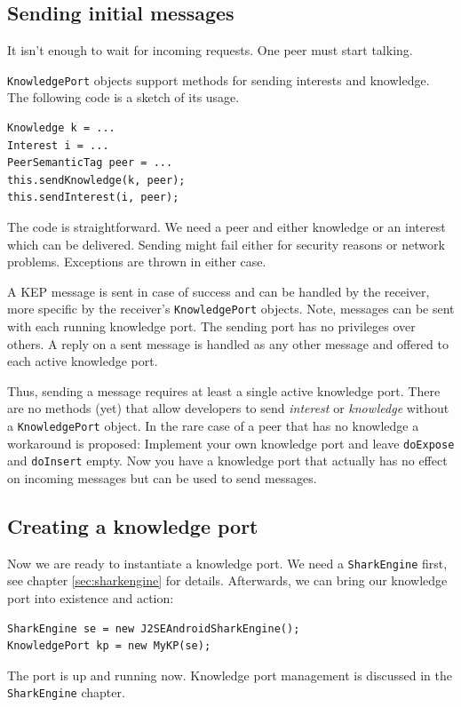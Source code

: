 \subsection{Sending initial messages}
It isn't enough to wait for incoming requests. One peer must start talking.

{\tt KnowledgePort} objects support methods for sending interests and knowledge. The following code is a sketch of its usage.

\begin{verbatim}
Knowledge k = ...
Interest i = ...
PeerSemanticTag peer = ...
this.sendKnowledge(k, peer);
this.sendInterest(i, peer);
\end{verbatim}

The code is straightforward. We need a peer and either knowledge or an interest which can be delivered. Sending might fail either for security reasons or network problems. Exceptions are thrown in either case.

A KEP message is sent in case of success and can be handled by the receiver, more specific by the receiver's {\tt KnowledgePort} objects. Note, messages can be sent with each running knowledge port. The sending port has no privileges over others. A reply on a sent message is handled as any other message and offered to each active knowledge port.

Thus, sending a message requires at least a single active knowledge port. 
There are no methods (yet) that allow developers to send {\it interest} or {\it knowledge} without a {\tt KnowledgePort} object. In the rare case of a peer that has no knowledge a workaround is proposed: Implement your own knowledge port and leave {\tt doExpose} and {\tt doInsert} empty. Now you have a knowledge port that actually has no effect on incoming messages but can be used to send messages.

\subsection{Creating a knowledge port}
Now we are ready to instantiate a knowledge port. We need a {\tt SharkEngine} first, see chapter \ref{sec:sharkengine} for details. Afterwards, we can bring our knowledge port into existence and action:

\begin{verbatim}
SharkEngine se = new J2SEAndroidSharkEngine();
KnowledgePort kp = new MyKP(se);
\end{verbatim}

The port is up and running now. Knowledge port management is discussed in the {\tt SharkEngine} chapter.

